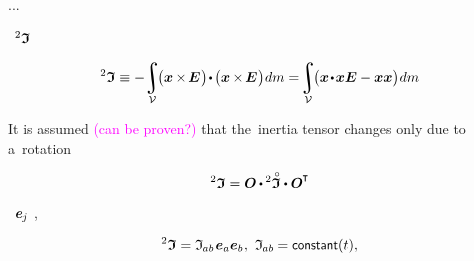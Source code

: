 ...

~${\inertiatensor}$

\nopagebreak\begin{equation*}
\inertiatensor
\equiv
- \hspace{-0.4ex} \integral_{\mathcal{V}} \hspace{-0.4ex} \bigl( \bm{x} \hspace{-0.1ex} \times \hspace{-0.22ex} \UnitDyad \hspace{.1ex} \bigr) \hspace{-0.3ex} \dotp \hspace{-0.2ex} \bigl( \bm{x} \hspace{-0.1ex} \times \hspace{-0.22ex} \UnitDyad \hspace{.1ex} \bigr) \hspace{.1ex} dm
=
\hspace{-0.4ex} \integral_{\mathcal{V}} \hspace{-0.4ex} \bigl( \bm{x} \narrowdotp \bm{x} \UnitDyad - \bm{x} \bm{x} \bigr) \hspace{.1ex} dm
\end{equation*}

It is assumed \textcolor{magenta}{(can be proven?)} that the~inertia tensor changes only due to a~rotation

\vspace{-0.1em}\begin{equation*}
\inertiatensor = \rotationtensor \hspace{-0.1ex} \dotp \inertiatensorcircabove \dotp \rotationtensor^{\hspace{-0.1ex}\T}
\end{equation*}

\vspace{-0.1em}\noindent
{}
~${\bm{e}_{\hspace{-0.1ex}j}}$
,

\nopagebreak\vspace{-0.1em}\begin{equation*}
\inertiatensor = \inertiatensorcomponents{ab} \hspace{.1ex} \bm{e}_a \bm{e}_b
\hspace{.1ex} , \hspace{.8ex}
\inertiatensorcomponents{ab} \hspace{-0.2ex} = \constant(t)
\vspace{.1ex} ,
\end{equation*}

